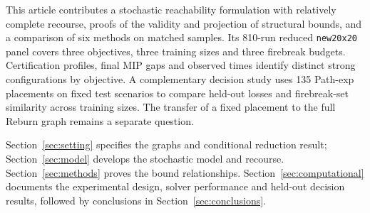 This article contributes a stochastic reachability formulation with
relatively complete recourse, proofs of the validity and projection of
structural bounds, and a comparison of six methods on matched samples.
Its 810-run reduced \texttt{new20x20} panel covers three objectives,
three training sizes and three firebreak budgets. Certification
profiles, final MIP gaps and observed times identify distinct strong
configurations by objective. A complementary decision study uses 135
Path-exp placements on fixed test scenarios to compare held-out losses
and firebreak-set similarity across training sizes. The transfer of a
fixed placement to the full Reburn graph remains a separate question.

Section~\ref{sec:setting} specifies the graphs and conditional reduction
result; Section~\ref{sec:model} develops the stochastic model and
recourse. Section~\ref{sec:methods} proves the bound relationships.
Section~\ref{sec:computational} documents the experimental design,
solver performance and held-out decision results, followed by
conclusions in Section~\ref{sec:conclusions}.
